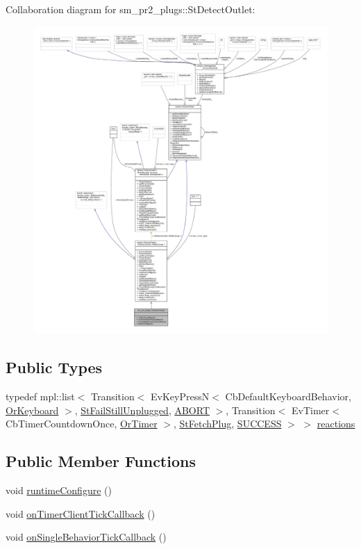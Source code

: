Collaboration diagram for sm\+\_\+pr2\+\_\+plugs\+:\+:St\+Detect\+Outlet\+:
\nopagebreak
\begin{figure}[H]
\begin{center}
\leavevmode
\includegraphics[width=350pt]{structsm__pr2__plugs_1_1StDetectOutlet__coll__graph}
\end{center}
\end{figure}
\subsection*{Public Types}
\begin{DoxyCompactItemize}
\item 
typedef mpl\+::list$<$ Transition$<$ Ev\+Key\+PressN$<$ Cb\+Default\+Keyboard\+Behavior, \hyperlink{classsm__pr2__plugs_1_1OrKeyboard}{Or\+Keyboard} $>$, \hyperlink{structsm__pr2__plugs_1_1StFailStillUnplugged}{St\+Fail\+Still\+Unplugged}, \hyperlink{classABORT}{A\+B\+O\+RT} $>$, Transition$<$ Ev\+Timer$<$ Cb\+Timer\+Countdown\+Once, \hyperlink{classsm__pr2__plugs_1_1OrTimer}{Or\+Timer} $>$, \hyperlink{structsm__pr2__plugs_1_1StFetchPlug}{St\+Fetch\+Plug}, \hyperlink{classSUCCESS}{S\+U\+C\+C\+E\+SS} $>$ $>$ \hyperlink{structsm__pr2__plugs_1_1StDetectOutlet_a5d2a06136d75847c4f23be956d5c157a}{reactions}
\end{DoxyCompactItemize}
\subsection*{Public Member Functions}
\begin{DoxyCompactItemize}
\item 
void \hyperlink{structsm__pr2__plugs_1_1StDetectOutlet_a9fbc44b452367aa843d37316eb6e64bc}{runtime\+Configure} ()
\item 
void \hyperlink{structsm__pr2__plugs_1_1StDetectOutlet_a7d94748f071c0ee4b8055018ec546978}{on\+Timer\+Client\+Tick\+Callback} ()
\item 
void \hyperlink{structsm__pr2__plugs_1_1StDetectOutlet_a866f3243790c115b886d447725fa602b}{on\+Single\+Behavior\+Tick\+Callback} ()
\end{DoxyCompactItemize}
